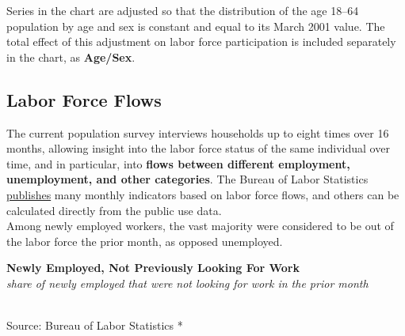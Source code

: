 \documentclass{report}
\makeatletter
\newcommand{\tbllink}[1]{\href{https://raw.githubusercontent.com/bdecon/US-chartbook/master/chartbook/data/#1}{\faTable}}
\newcommand*\short[1]{\expandafter\@gobbletwo\number\numexpr#1\relax}
\newcommand{\dateaxisticks}{
		date coordinates in=x, axis line style={draw=none},
		xmax={2020-05-10},
		max space between ticks=40,	    
		xtick={{1990-01-01}, {1992-01-01}, {1994-01-01}, 
			{1996-01-01}, {1998-01-01}, {2000-01-01}, 
			{2002-01-01}, {2004-01-01}, {2006-01-01},
			{2008-01-01}, {2010-01-01}, {2012-01-01}, {2014-01-01},
		    {2016-01-01}, {2018-01-01}, {2020-01-01}},
		minor xtick={{1989-01-01}, {1991-01-01}, {1993-01-01},
			{1995-01-01}, {1997-01-01}, {1999-01-01}, 
			{2001-01-01}, {2003-01-01}, {2005-01-01}, {2007-01-01},
		    {2009-01-01}, {2011-01-01}, {2013-01-01}, {2015-01-01},
		    {2017-01-01}, {2019-01-01}},
		enlarge y limits={0.06}, enlarge x limits={0.01},
		}
\newcommand{\bbar}[2]{extra #1 ticks = {{#2}}, extra #1 tick labels = ,
		extra #1 tick style = {grid=major, grid style={thick, black!25}},}
\newcommand{\stdline}[4]{\addplot[very thick, no markers, color=#1] 
		table [x=#2, y=#3, col sep=comma] {#4};	}
\newcommand{\rbars}{
		\fill[color=black!10] (axis cs:{1990-07-01},\pgfkeysvalueof{/pgfplots/ymin}) rectangle 
			(axis cs:{1991-03-01}, \pgfkeysvalueof{/pgfplots/ymax});
		\fill[color=black!10] (axis cs:{2007-12-01},\pgfkeysvalueof{/pgfplots/ymin}) rectangle 
			(axis cs:{2009-07-01}, \pgfkeysvalueof{/pgfplots/ymax});
		\fill[color=black!10] (axis cs:{2001-03-01},\pgfkeysvalueof{/pgfplots/ymin}) rectangle 
			(axis cs:{2001-11-01}, \pgfkeysvalueof{/pgfplots/ymax});}
\makeatother
\begin{document}
{{{{{{{{{\begin{minipage}{0.42\textwidth}
\footnotesize Series in the chart are adjusted so that the distribution of the age 18--64 population by age and sex is constant and equal to its March 2001 value. The total effect of this adjustment on labor force participation is included separately in the chart, as \color{violet!80!purple}\textbf{Age/Sex}.
\end{minipage}

\newpage


\begin{minipage}{0.76\textwidth}

\subsection*{\color{black!70} \seriffont Labor Force Flows}

\small The current population survey interviews households up to eight times over 16 months, allowing insight into the labor force status of the same individual over time, and in particular, into \textbf{flows between different employment, unemployment, and other categories}. The Bureau of Labor Statistics \href{https://www.bls.gov/cps/cps_flows.htm}{publishes} many monthly indicators based on labor force flows, and others can be calculated directly from the public use data.\\

Among newly employed workers, the vast majority were considered to be out of the labor force the prior month, as opposed unemployed.  \\

\vspace{2mm}

\noindent \normalsize \textbf{Newly Employed, Not Previously Looking For Work}\\
\footnotesize{\textit{share of newly employed that were not looking for work in the prior month}}\\
\noindent \hspace*{-2mm} \\
\footnotesize{Source: Bureau of Labor Statistics} \hfill \tbllink{lf_flow.csv}*


\end{minipage}}}}}}}}}}
\end{document}
